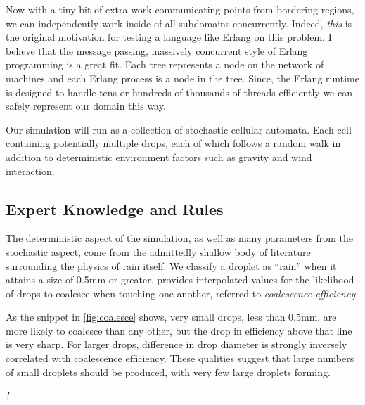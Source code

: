 \documentclass[twocolumn,a4paper,10pt]{article}
\newcommand{\TODO}{{\huge\emph{\color{red}!}}}
\begin{document}
Now with a tiny bit of extra work communicating points from bordering regions,
we can independently work inside of all subdomains concurrently. Indeed,
\emph{this} is the original motivation for testing a language like Erlang on
this problem. I believe that the message passing, massively concurrent style of
Erlang programming is a great fit. Each tree represents a node on the network of
machines and each Erlang process is a node in the tree. Since, the Erlang
runtime is designed to handle tens or hundreds of thousands of threads
efficiently we can safely represent our domain this way.

Our simulation will run as a collection of stochastic cellular automata. Each
cell containing potentially multiple drops, each of which follows a random walk
in addition to deterministic environment factors such as gravity and wind
interaction.


\subsection{Expert Knowledge and Rules}
\label{sec:rules}

The deterministic aspect of the simulation, as well as many parameters from the
stochastic aspect, come from the admittedly shallow body of literature
surrounding the physics of rain itself. We classify a droplet as ``rain'' when
it attains a size of 0.5mm or greater. \citet{hu1998} provides interpolated
values for the likelihood of drops to coalesce when touching one another,
referred to \emph{coalescence efficiency}.

As the snippet in \autoref{fig:coalesce} shows, very small drops, less than
0.5mm, are more likely to coalesce than any other, but the drop in efficiency
above that line is very sharp. For larger drops, difference in drop diameter is
strongly inversely correlated with coalescence efficiency. These qualities
suggest that large numbers of small droplets should be produced, with very few
large droplets forming.

\TODO 

\end{document}
